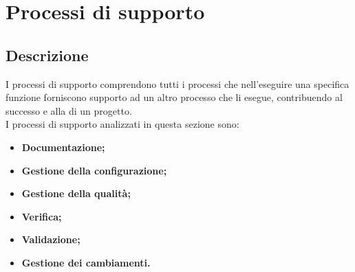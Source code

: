 \section{Processi di supporto}\label{ProcSup}
\subsection{Descrizione}\label{PSup_Descrizione}
I processi di supporto comprendono tutti i processi che nell'eseguire una specifica funzione forniscono supporto ad un altro processo che li esegue, contribuendo al successo e alla  di un progetto.\\
I processi di supporto analizzati in questa sezione sono:
\begin{itemize}
	\item \textbf{Documentazione;}
	\item \textbf{Gestione della configurazione;}
	\item \textbf{Gestione della qualità;}
	\item \textbf{Verifica;}
	\item \textbf{Validazione;}
	\item \textbf{Gestione dei cambiamenti.}
\end{itemize}


\newpage

\newpage

\newpage

\newpage

\newpage
